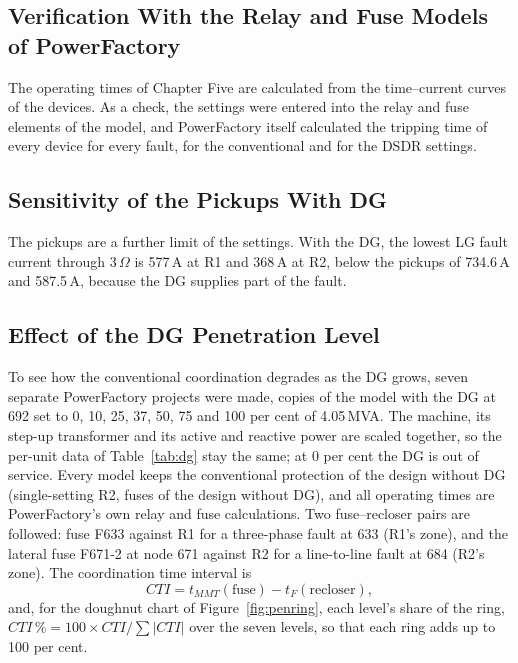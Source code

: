 \documentclass[12pt,a4paper]{article}
\newcommand{\ohm}{\,\ensuremath{\Omega}}
\newcommand{\PF}{PowerFactory}
\begin{document}
\subsection{Verification With the Relay and Fuse Models of \PF}
The operating times of Chapter Five are calculated from the time--current curves of the devices. As a check,
the settings were entered into the relay and fuse elements of the model, and \PF{} itself calculated the tripping
time of every device for every fault, for the conventional and for the DSDR settings.

\subsection{Sensitivity of the Pickups With DG}
\label{sec:pickdg}
The pickups are a further limit of the settings. With the DG, the lowest LG fault current through 3\ohm{} is
577\,A at R1 and 368\,A at R2, below the pickups of 734.6\,A and 587.5\,A, because the DG supplies part of
the fault.

\subsection{Effect of the DG Penetration Level}
\label{sec:pen}
To see how the conventional coordination degrades as the DG grows, seven separate \PF{} projects were made,
copies of the model with the DG at 692 set to 0, 10, 25, 37, 50, 75 and 100 per cent of 4.05\,MVA. The machine, its
step-up transformer and its active and reactive power are scaled together, so the per-unit data of
Table~\ref{tab:dg} stay the same; at 0 per cent the DG is out of service. Every model keeps the conventional
protection of the design without DG (single-setting R2, fuses of the design without DG), and all operating
times are \PF's own relay and fuse calculations. Two fuse--recloser pairs are followed: fuse F633 against R1
for a three-phase fault at 633 (R1's zone), and the lateral fuse F671-2 at node 671 against R2 for a
line-to-line fault at 684 (R2's zone). The coordination time interval is
\begin{equation}
CTI = t_{MMT}(\text{fuse}) - t_{F}(\text{recloser}),
\label{eq:cti}
\end{equation}
and, for the doughnut chart of Figure~\ref{fig:penring}, each level's share of the ring,
$CTI\,\% = 100 \times CTI / \sum |CTI|$ over the seven levels, so that each ring adds up to 100 per cent.
\end{document}
